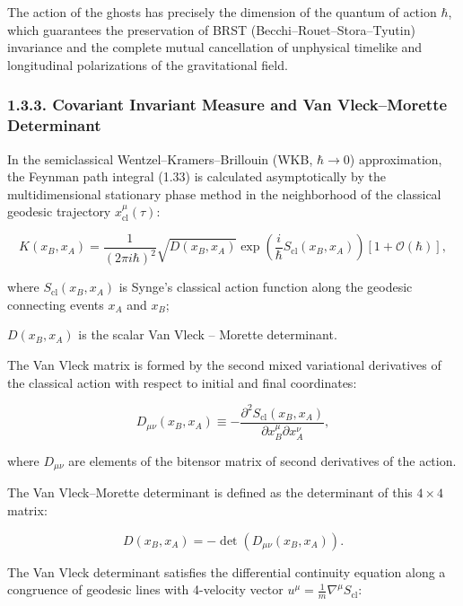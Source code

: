 The action of the ghosts has precisely the dimension of the quantum of action $\hbar$, which guarantees the preservation of BRST (Becchi--Rouet--Stora--Tyutin) invariance and the complete mutual cancellation of unphysical timelike and longitudinal polarizations of the gravitational field.


\subsubsection{1.3.3. Covariant Invariant Measure and Van Vleck--Morette Determinant}\label{sec:1.3.3}

In the semiclassical Wentzel--Kramers--Brillouin (WKB, $\hbar \to 0$) approximation, the Feynman path integral (1.33) is calculated asymptotically by the multidimensional stationary phase method in the neighborhood of the classical geodesic trajectory $x_{\text{cl}}^\mu(\tau)$:

\begin{equation}\label{eq:1.52}\tag{1.52}
K(x_B, x_A) = \frac{1}{(2\pi i \hbar)^2} \sqrt{D(x_B, x_A)} \exp\left( \frac{i}{\hbar} S_{\text{cl}}(x_B, x_A) \right) \left[ 1 + \mathcal{O}(\hbar) \right],
\end{equation}

where $S_{\text{cl}}(x_B, x_A)$ is Synge's classical action function along the geodesic connecting events $x_A$ and $x_B$;  

$D(x_B, x_A)$ is the scalar Van Vleck \cite{ref8} -- Morette \cite{ref9} determinant.

The Van Vleck matrix is formed by the second mixed variational derivatives of the classical action with respect to initial and final coordinates:

\begin{equation}\label{eq:1.53}\tag{1.53}
D_{\mu\nu}(x_B, x_A) \equiv -\frac{\partial^2 S_{\text{cl}}(x_B, x_A)}{\partial x_B^\mu \partial x_A^\nu},
\end{equation}

where $D_{\mu\nu}$ are elements of the bitensor matrix of second derivatives of the action.

The Van Vleck--Morette determinant is defined as the determinant of this $4 \times 4$ matrix:

\begin{equation}\label{eq:1.55}\tag{1.55}
D(x_B, x_A) = -\det \left( D_{\mu\nu}(x_B, x_A) \right).
\end{equation}

The Van Vleck determinant satisfies the differential continuity equation along a congruence of geodesic lines with 4-velocity vector $u^\mu = \frac{1}{m} \nabla^\mu S_{\text{cl}}$:

